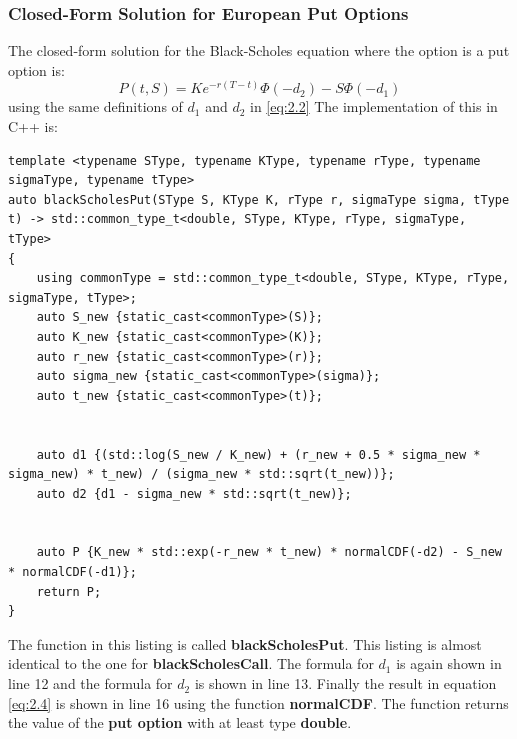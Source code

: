 \documentclass[12pt]{article}
\numberwithin{equation}{section}
\begin{document}
\subsubsection{Closed-Form Solution for European Put Options}
 The closed-form solution for the Black-Scholes equation where the option is a put option is:
\begin{equation}
	P(t,S) = Ke^{-r(T-t)}\Phi(-d_2) - S\Phi(-d_1)
	\label{eq:2.4}
\end{equation}
using the same definitions of $d_1$ and $d_2$ in \ref{eq:2.2} \newline
The implementation of this in C++ is:

 \begin{lstlisting}[style=cpp]
template <typename SType, typename KType, typename rType, typename sigmaType, typename tType>
auto blackScholesPut(SType S, KType K, rType r, sigmaType sigma, tType t) -> std::common_type_t<double, SType, KType, rType, sigmaType, tType>
{
	using commonType = std::common_type_t<double, SType, KType, rType, sigmaType, tType>;
	auto S_new {static_cast<commonType>(S)};
	auto K_new {static_cast<commonType>(K)};
	auto r_new {static_cast<commonType>(r)};
	auto sigma_new {static_cast<commonType>(sigma)};
	auto t_new {static_cast<commonType>(t)};
	
	
	auto d1 {(std::log(S_new / K_new) + (r_new + 0.5 * sigma_new * sigma_new) * t_new) / (sigma_new * std::sqrt(t_new))};
	auto d2 {d1 - sigma_new * std::sqrt(t_new)};
	
	
	auto P {K_new * std::exp(-r_new * t_new) * normalCDF(-d2) - S_new * normalCDF(-d1)};
	return P;
}
\end{lstlisting}
 The function in this listing is called \textbf{blackScholesPut}. This listing is almost identical to the one for \textbf{blackScholesCall}. The formula for $d_1$ is again shown in line 12 and the formula for $d_2$ is shown in line 13.  Finally the result in equation \ref{eq:2.4} is shown in line 16 using the function \textbf{normalCDF}. The function returns the value of the \textbf{put option} with at least type \textbf{double}. 
\newpage
\end{document}
